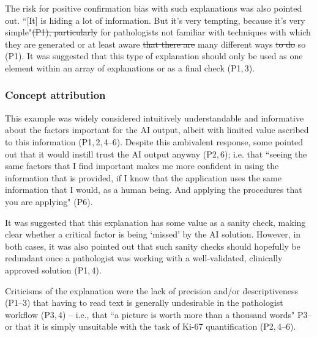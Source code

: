 \documentclass[final,5p,times,twocolumn,hyphens]{elsarticle}
\providecommand{\DIFaddtex}[1]{{\protect\color{blue}\uwave{#1}}} %
\providecommand{\DIFdeltex}[1]{{\protect\color{red}\sout{#1}}}                      %
\providecommand{\DIFaddbegin}{} %
\providecommand{\DIFaddend}{} %
\providecommand{\DIFdelbegin}{} %
\providecommand{\DIFdelend}{} %
\providecommand{\DIFadd}[1]{\texorpdfstring{\DIFaddtex{#1}}{#1}} %
\providecommand{\DIFdel}[1]{\texorpdfstring{\DIFdeltex{#1}}{}} %
\newcommand{\DIFscaledelfig}{0.5}
\newlength{\DIFdelgraphicswidth} %
\newlength{\DIFdelgraphicsheight} %
\newcommand{\DIFaddincludegraphics}[2][]{{\color{blue}\fbox{\DIFOincludegraphics[#1]{#2}}}} %
\newcommand{\DIFdelincludegraphics}[2][]{%
\sbox{\DIFdelgraphicsbox}{\DIFOincludegraphics[#1]{#2}}%
\settoboxwidth{\DIFdelgraphicswidth}{\DIFdelgraphicsbox} %
\settoboxtotalheight{\DIFdelgraphicsheight}{\DIFdelgraphicsbox} %
\scalebox{\DIFscaledelfig}{%
\parbox[b]{\DIFdelgraphicswidth}{\usebox{\DIFdelgraphicsbox}\\[-\baselineskip] \rule{\DIFdelgraphicswidth}{0em}}\llap{\resizebox{\DIFdelgraphicswidth}{\DIFdelgraphicsheight}{%
\setlength{\unitlength}{\DIFdelgraphicswidth}%
\begin{picture}(1,1)%
\thicklines\linethickness{2pt} %
{\color[rgb]{1,0,0}\put(0,0){\framebox(1,1){}}}%
{\color[rgb]{1,0,0}\put(0,0){\line( 1,1){1}}}%
{\color[rgb]{1,0,0}\put(0,1){\line(1,-1){1}}}%
\end{picture}%
}\hspace*{3pt}}} %
} %
\DeclareRobustCommand{\DIFaddbegin}{\DIFOaddbegin \let\includegraphics\DIFaddincludegraphics} %
\DeclareRobustCommand{\DIFaddend}{\DIFOaddend \let\includegraphics\DIFOincludegraphics} %
\DeclareRobustCommand{\DIFdelbegin}{\DIFOdelbegin \let\includegraphics\DIFdelincludegraphics} %
\DeclareRobustCommand{\DIFdelend}{\DIFOaddend \let\includegraphics\DIFOincludegraphics} %
\begin{document}
The risk for positive confirmation bias with such explanations was also pointed out. ``[It] is hiding a lot of information. But it's very tempting, because it's very simple"\DIFdelbegin \DIFdel{(P1), particularly }\DIFdelend \DIFaddbegin \DIFadd{, in particular }\DIFaddend for pathologists not familiar with techniques with which they are generated or at least aware \DIFdelbegin \DIFdel{that there are }\DIFdelend \DIFaddbegin \DIFadd{of the }\DIFaddend many different ways \DIFdelbegin \DIFdel{to do }\DIFdelend \DIFaddbegin \DIFadd{available for doing }\DIFaddend so (P1). It was suggested that this type of explanation should only be used as one element within an array of explanations or as a final check (P1,\,3).

\subsubsection{Concept attribution}

This example was widely considered intuitively understandable and informative about the factors important for the AI output, albeit with limited value ascribed to this information (P1,\,2,\,4--6). Despite this ambivalent response, some pointed out that it would instill trust the AI output anyway (P2,\,6); i.e. that ``seeing the same factors that I find important makes me more confident in using the information that is provided, if I know that the application uses the same information that I would, as a human being. And applying the procedures that you are applying" (P6). 


It was suggested that this explanation has some value as a sanity check, making clear whether a critical factor is being `missed' by the AI solution. However, in both cases, it was also pointed out that such sanity checks should hopefully be redundant once a pathologist was working with a well-validated, clinically approved solution (P1,\,4).

Criticisms of the explanation were the lack of precision and/or descriptiveness (P1--3) that having to read text is generally undesirable in the pathologist workflow (P3,\,4) -- i.e., that ``a picture is worth more than a thousand words" \DIFaddbegin \DIFadd{(}\DIFaddend P3\DIFaddbegin \DIFadd{) }\DIFaddend -- or that it is simply unsuitable with the task of Ki-67 quantification (P2,\,4--6). 
\end{document}
